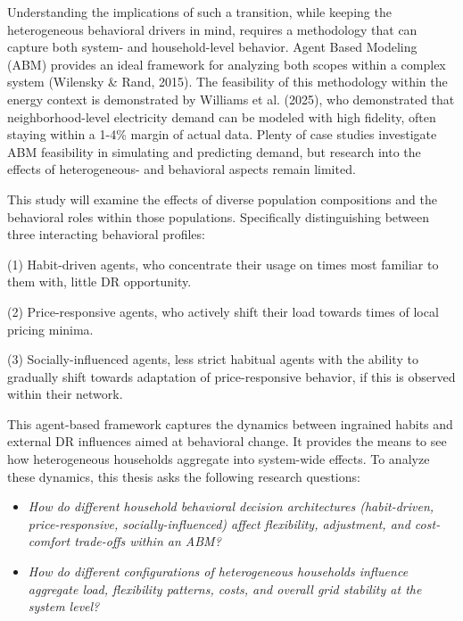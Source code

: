 \documentclass[11pt, a4paper]{article}
\begin{document}
Understanding the implications of such a transition, while keeping the heterogeneous behavioral drivers in mind, requires a methodology that can capture both system- and household-level behavior. Agent Based Modeling (ABM) provides an ideal framework for analyzing both scopes within a complex system (Wilensky \& Rand, 2015). The feasibility of this methodology within the energy context is demonstrated by Williams et al. (2025), who demonstrated that neighborhood-level electricity demand can be modeled with high fidelity, often staying within a 1-4\% margin of actual data. Plenty of case studies investigate ABM feasibility in simulating and predicting demand, but research into the effects of heterogeneous- and behavioral aspects remain limited.

\medskip

This study will examine the effects of diverse population compositions and the behavioral roles within those populations. Specifically distinguishing between three interacting behavioral profiles: 

(1) Habit-driven agents, who concentrate their usage on times most familiar to them with, little DR opportunity. 

(2) Price-responsive agents, who actively shift their load towards times of local pricing minima. 

(3) Socially-influenced agents, less strict habitual agents with the ability to gradually shift towards adaptation of price-responsive behavior, if this is observed within their network.  

\medskip

This agent-based framework captures the dynamics between ingrained habits and external DR influences aimed at behavioral change. It provides the means to see how heterogeneous households aggregate into system-wide effects. To analyze these dynamics, this thesis asks the following research questions:

\begin{itemize}
    \item[RQ1] \emph{How do different household behavioral decision
architectures (habit-driven, price-responsive,
socially-influenced) affect flexibility, adjustment, and cost-comfort
trade-offs within an ABM?}
    \item[RQ2] \emph{How do different configurations of heterogeneous households influence aggregate load, flexibility patterns, costs, and overall grid stability at the system level?}
\end{itemize}
\end{document}
